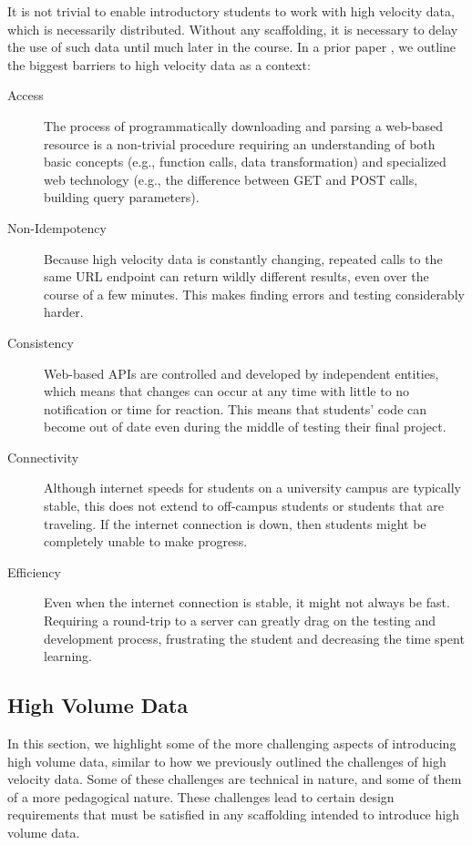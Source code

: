 It is not trivial to enable introductory students to work with high velocity data, which is necessarily distributed. Without any scaffolding, it is necessary to delay the use of such data until much later in the course. In a prior paper \cite{realtimeweb-splashe}, we outline the biggest barriers to high velocity data as a context:
\begin{description}
  \item[Access] The process of programmatically downloading and parsing a web-based resource is a non-trivial procedure requiring an understanding of both basic concepts (e.g., function calls, data transformation) and specialized web technology (e.g., the difference between GET and POST calls, building query parameters).
	\item[Non-Idempotency] Because high velocity data is constantly changing, repeated calls to the same URL endpoint can return wildly different results, even over the course of a few minutes. This makes finding errors and testing considerably harder.
	\item[Consistency] Web-based APIs are controlled and developed by independent entities, which means that changes can occur at any time with little to no notification or time for reaction. This means that students' code can become out of date even during the middle of testing their final project.
	\item[Connectivity] Although internet speeds for students on a university campus are typically stable, this does not extend to off-campus students or students that are traveling. If the internet connection is down, then students might be completely unable to make progress.
	\item[Efficiency] Even when the internet connection is stable, it might not always be fast. Requiring a round-trip to a server can greatly drag on the testing and development process, frustrating the student and decreasing the time spent learning.
\end{description}

\subsection{High Volume Data}

In this section, we highlight some of the more challenging aspects of introducing high volume data, similar to how we previously outlined the challenges of high velocity data.
Some of these challenges are technical in nature, and some of them of a more pedagogical nature.
These challenges lead to certain design requirements that must be satisfied in any scaffolding intended to introduce high volume data.

